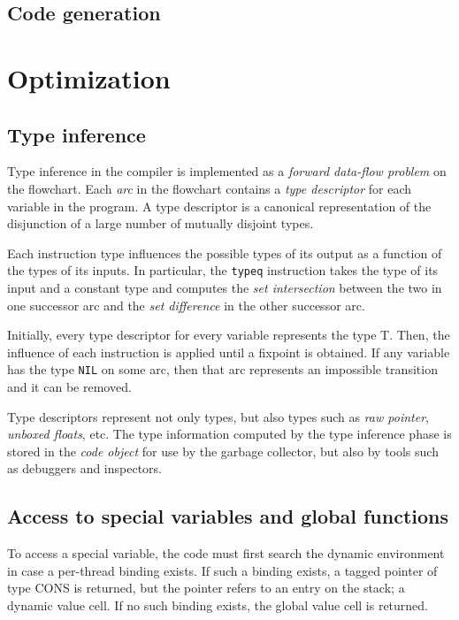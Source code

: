 \subsection{Code generation} 

\section{Optimization}

\subsection{Type inference}

Type inference in the \sysname{} compiler is implemented as a
\emph{forward data-flow problem} on the flowchart.  Each \emph{arc} in
the flowchart contains a \emph{type descriptor} for each variable in
the program.  A type descriptor is a canonical representation of the
disjunction of a large number of mutually disjoint types.  

Each instruction type influences the possible types of its output as a
function of the types of its inputs.  In particular, the
\texttt{typeq} instruction takes the type of its input and a constant
type and computes the \emph{set intersection}
between the two in one successor arc and the \emph{set difference} in
the other successor arc.  

Initially, every type descriptor for every variable represents the
type T.  Then, the influence of each instruction is applied until
a fixpoint is obtained.  If any variable has the type \texttt{NIL} on
some arc, then that arc represents an impossible transition and it can
be removed. 

Type descriptors represent not only \cl{} types, but also types such
as \emph{raw pointer}, \emph{unboxed floats}, etc.  The type
information computed by the type inference phase is stored in the
\emph{code object} for use by the garbage collector, but also by tools
such as debuggers and inspectors. 

\subsection{Access to special variables and global functions}

To access a special variable, the code must first search the dynamic
environment in case a per-thread binding exists.  If such a binding
exists, a tagged pointer of type CONS is returned, but the pointer
refers to an entry on the stack; a dynamic value cell.  If no such
binding exists, the global value cell is returned.

